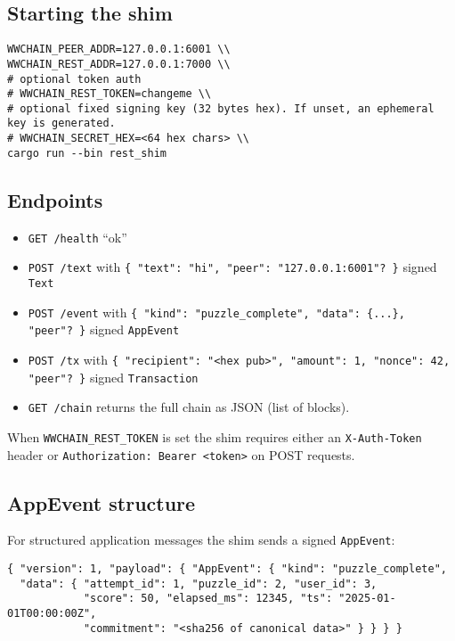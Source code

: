 \subsection{Starting the shim}
\begin{verbatim}
WWCHAIN_PEER_ADDR=127.0.0.1:6001 \\
WWCHAIN_REST_ADDR=127.0.0.1:7000 \\
# optional token auth
# WWCHAIN_REST_TOKEN=changeme \\
# optional fixed signing key (32 bytes hex). If unset, an ephemeral key is generated.
# WWCHAIN_SECRET_HEX=<64 hex chars> \\
cargo run --bin rest_shim
\end{verbatim}

\subsection{Endpoints}
\begin{itemize}
\item \texttt{GET /health} \to ``ok''
\item \texttt{POST /text} with \texttt{\{ "text": "hi", "peer": "127.0.0.1:6001"? \}} \to signed \texttt{Text}
\item \texttt{POST /event} with \texttt{\{ "kind": "puzzle\_complete", "data": \{...\}, "peer"? \}} \to signed \texttt{AppEvent}
\item \texttt{POST /tx} with \texttt{\{ "recipient": "<hex pub>", "amount": 1, "nonce": 42, "peer"? \}} \to signed \texttt{Transaction}
\item \texttt{GET /chain} returns the full chain as JSON (list of blocks).
\end{itemize}

When \texttt{WWCHAIN\_REST\_TOKEN} is set the shim requires either an \texttt{X-Auth-Token} header or \texttt{Authorization: Bearer <token>} on POST requests.

\subsection{AppEvent structure}
For structured application messages the shim sends a signed \texttt{AppEvent}:
\begin{verbatim}
{ "version": 1, "payload": { "AppEvent": { "kind": "puzzle_complete",
  "data": { "attempt_id": 1, "puzzle_id": 2, "user_id": 3,
            "score": 50, "elapsed_ms": 12345, "ts": "2025-01-01T00:00:00Z",
            "commitment": "<sha256 of canonical data>" } } } }
\end{verbatim}

